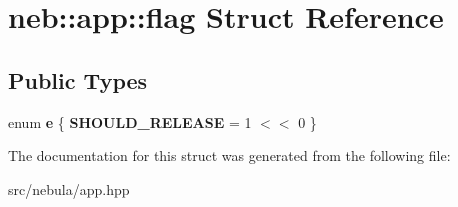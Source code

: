 \hypertarget{structneb_1_1app_1_1flag}{
\section{neb::app::flag Struct Reference}
\label{structneb_1_1app_1_1flag}
}
\subsection*{Public Types}
\begin{DoxyCompactItemize}
\item 
enum {\bfseries e} \{ {\bfseries SHOULD\_\-RELEASE} =  1 $<$$<$ 0
 \}
\end{DoxyCompactItemize}


The documentation for this struct was generated from the following file:\begin{DoxyCompactItemize}
\item 
src/nebula/app.hpp\end{DoxyCompactItemize}
